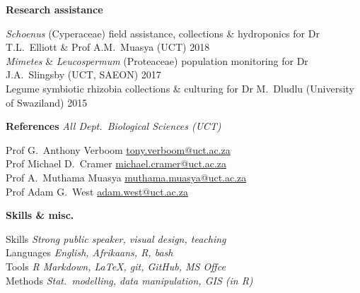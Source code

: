\documentclass[10pt]{article}
\begin{document}
\textbf{Research assistance} %

\textit{Schoenus} (Cyperaceae)
  field assistance, collections \& hydroponics
  for Dr T.L.~Elliott \& Prof A.M.~Muasya
  {\small (UCT)}                                         \hfill {\small 2018} \\
\textit{Mimetes} \& \textit{Leucospermum} (Proteaceae)
  population monitoring
  for Dr J.A.~Slingsby
  {\small (UCT, SAEON)}                                  \hfill {\small 2017} \\
Legume symbiotic rhizobia
  collections \& culturing
  for Dr M.~Dludlu
  {\small (University of Swaziland)}                     \hfill {\small 2015}

\begin{multicols}{2} %

\textbf{References} %
                    \hfill {\small \textit{All Dept.~Biological Sciences (UCT)}}

Prof G.~Anthony Verboom
      \hfill     \href{mailto:tony.verboom@uct.ac.za}{tony.verboom@uct.ac.za} \\
Prof Michael D.~Cramer
      \hfill \href{mailto:michael.cramer@uct.ac.za}{michael.cramer@uct.ac.za} \\
Prof A.~Muthama Muasya
      \hfill \href{mailto:muthama.muasya@uct.ac.za}{muthama.muasya@uct.ac.za} \\
Prof Adam G.~West
      \hfill           \href{mailto:adam.west@uct.ac.za}{adam.west@uct.ac.za}

\columnbreak

\textbf{Skills \& misc.} %


Skills         \hfill \textit{Strong public speaker, visual design, teaching} \\
Languages      \hfill \textit{                   English, Afrikaans, R, bash} \\
Tools          \hfill \textit{      R Markdown, LaTeX, git, GitHub, MS Offce} \\
Methods        \hfill \textit{Stat.~modelling, data manipulation, GIS (in R)}

\end{multicols} %
\end{document}
